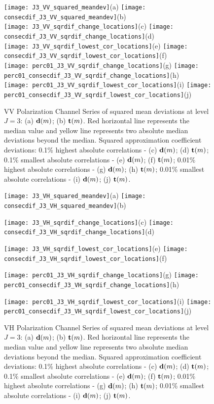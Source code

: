 \documentclass[journal]{IEEEtran}
\newcommand{\vd}{{\textbf d}}
\newcommand{\vt}{{\textbf t}}
\begin{document}
\begin{figure}[htp!]
\texttt{[image: J3\_VV\_squared\_meandev]}(a)
\texttt{[image: consecdif\_J3\_VV\_squared\_meandev]}(b)\\
\texttt{[image: J3\_VV\_sqrdif\_change\_locations]}(c)
\texttt{[image: consecdif\_J3\_VV\_sqrdif\_change\_locations]}(d)\\
\texttt{[image: J3\_VV\_sqrdif\_lowest\_cor\_locations]}(e)
\texttt{[image: consecdif\_J3\_VV\_sqrdif\_lowest\_cor\_locations]}(f)\\
\texttt{[image: perc01\_J3\_VV\_sqrdif\_change\_locations]}(g)
\texttt{[image: perc01\_consecdif\_J3\_VV\_sqrdif\_change\_locations]}(h)\\
\texttt{[image: perc01\_J3\_VV\_sqrdif\_lowest\_cor\_locations]}(i)
\texttt{[image: perc01\_consecdif\_J3\_VV\_sqrdif\_lowest\_cor\_locations]}(j)
\caption{{\sc VV Polarization Channel} Series of squared mean deviations at level $J=3$: (a) $\vd(m)$; (b) $\vt(m)$. Red horizontal line represents the median value and yellow line represents two absolute median deviations beyond the median. Squared approximation coefficient deviations: 0.1\% highest absolute correlations - (c) $\vd(m)$;  (d) $\vt(m)$; 0.1\% smallest absolute correlations - (e) $\vd(m)$; (f) $\vt(m)$; 0.01\% highest absolute correlations - (g) $\vd(m)$;  (h) $\vt(m)$;  0.01\% smallest absolute correlations - (i) $\vd(m)$; (j)  $\vt(m)$. 
}  
\label{F:squared_meandev_J3_VV}
\end{figure}

\begin{figure}[htp!]
\texttt{[image: J3\_VH\_squared\_meandev]}(a)
\texttt{[image: consecdif\_J3\_VH\_squared\_meandev]}(b)

\texttt{[image: J3\_VH\_sqrdif\_change\_locations]}(c)
\texttt{[image: consecdif\_J3\_VH\_sqrdif\_change\_locations]}(d)

\texttt{[image: J3\_VH\_sqrdif\_lowest\_cor\_locations]}(e)
\texttt{[image: consecdif\_J3\_VH\_sqrdif\_lowest\_cor\_locations]}(f)

\texttt{[image: perc01\_J3\_VH\_sqrdif\_change\_locations]}(g)
\texttt{[image: perc01\_consecdif\_J3\_VH\_sqrdif\_change\_locations]}(h)

\texttt{[image: perc01\_J3\_VH\_sqrdif\_lowest\_cor\_locations]}(i)
\texttt{[image: perc01\_consecdif\_J3\_VH\_sqrdif\_lowest\_cor\_locations]}(j)

\caption{{\sc VH Polarization Channel} Series of squared mean deviations at level $J=3$: (a) $\vd(m)$; (b) $\vt(m)$. Red horizontal line represents the median value and yellow line represents two absolute median deviations beyond the median. Squared approximation coefficient deviations: 0.1\% highest absolute correlations - (c) $\vd(m)$;  (d) $\vt(m)$; 0.1\% smallest absolute correlations - (e) $\vd(m)$; (f) $\vt(m)$; 0.01\% highest absolute correlations - (g) $\vd(m)$;  (h) $\vt(m)$;  0.01\% smallest absolute correlations - (i) $\vd(m)$; (j)  $\vt(m)$. 
}  
\label{F:squared_meandev_J3_VH}
\end{figure}
\end{document}
